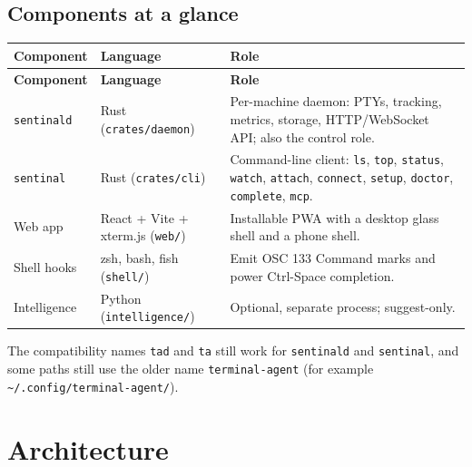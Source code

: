 \section{\texorpdfstring{Components at a glance}{Components at a glance}}

\begin{small}
\begin{longtable}{>{\raggedright\arraybackslash}p{0.15\dimexpr \linewidth-6\tabcolsep\relax}>{\raggedright\arraybackslash}p{0.24\dimexpr \linewidth-6\tabcolsep\relax}>{\raggedright\arraybackslash}p{0.611\dimexpr \linewidth-6\tabcolsep\relax}}
\toprule
\textbf{Component} & \textbf{Language} & \textbf{Role} \\
\midrule
\endfirsthead
\toprule
\textbf{Component} & \textbf{Language} & \textbf{Role} \\
\midrule
\endhead
\texttt{sentinald} & Rust (\texttt{crates/\allowbreak{}daemon}) & Per-machine daemon: PTYs, tracking, metrics, storage, HTTP/WebSocket API; also the control role. \\
\texttt{sentinal} & Rust (\texttt{crates/\allowbreak{}cli}) & Command-line client: \texttt{ls}, \texttt{top}, \texttt{status}, \texttt{watch}, \texttt{attach}, \texttt{connect}, \texttt{setup}, \texttt{doctor}, \texttt{complete}, \texttt{mcp}. \\
Web app & React + Vite + xterm.js (\texttt{web/\allowbreak{}}) & Installable PWA with a desktop glass shell and a phone shell. \\
Shell hooks & zsh, bash, fish (\texttt{shell/\allowbreak{}}) & Emit OSC 133 Command marks and power Ctrl-Space completion. \\
Intelligence & Python (\texttt{intelligence/\allowbreak{}}) & Optional, separate process; suggest-only. \\
\bottomrule
\end{longtable}
\end{small}

The compatibility names \texttt{tad} and \texttt{ta} still work for \texttt{sentinald} and \texttt{sentinal}, and some paths still use the older name \texttt{terminal-{}\allowbreak{}agent} (for example \texttt{\textasciitilde{}/\allowbreak{}.\allowbreak{}config/\allowbreak{}terminal-{}\allowbreak{}agent/\allowbreak{}}).

\chapter{\texorpdfstring{Architecture}{Architecture}}

